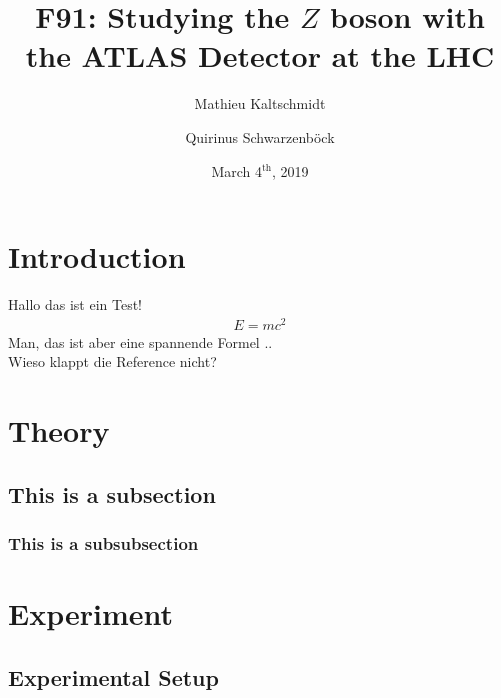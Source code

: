 \documentclass[twocolumn,
			   showpacs,%
               nofootinbib,
               aps,%
               eqsecnum,
               prd,
               notitlepage,
               showkeys,
               10pt]{revtex4-1}
\begin{document}
\title{F91: Studying the $Z$ boson with the ATLAS Detector at the LHC }
\author{Mathieu Kaltschmidt}
\author{Quirinus Schwarzenb\"ock}

\date[Carried out in the week of  ]{March 4$^{\text{th}}$, 2019}


\begin{abstract}
\blindtext
\end{abstract}

\maketitle



\section{Introduction}
Hallo das ist ein Test!
\begin{align}
	E = mc^2 
\end{align}
Man, das ist aber eine spannende Formel  .. \\
Wieso klappt die Reference nicht?

\blindtext



\section{Theory}

\blindtext

\subsection{This is a subsection}

\subsubsection{This is a subsubsection}





\section{Experiment}




\subsection{Experimental Setup}
\end{document}
